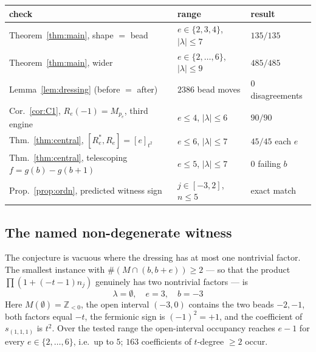 \documentclass[11pt]{article}
\theoremstyle{definition}
\newcommand{\Z}{\mathbb{Z}}
\newcommand{\Mult}[1]{M_{#1}}
\begin{document}
\begin{center}
\begin{tabular}{lll}
\hline
check & range & result\\
\hline
Theorem~\ref{thm:main}, shape $=$ bead & $e\in\{2,3,4\}$, $|\lambda|\le7$ & $135/135$\\
Theorem~\ref{thm:main}, wider & $e\in\{2,\dots,6\}$, $|\lambda|\le9$ & $485/485$\\
Lemma~\ref{lem:dressing} (before $=$ after) & $2386$ bead moves & $0$ disagreements\\
Cor.~\ref{cor:C1}, $R_e(-1)=\Mult{p_e}$, third engine & $e\le4$, $|\lambda|\le6$ & $90/90$\\
Thm.~\ref{thm:central}, $[R_e^{*},R_e]=[e]_{t^2}$ & $e\le6$, $|\lambda|\le7$ & $45/45$ each $e$\\
Thm.~\ref{thm:central}, telescoping $f=g(b)-g(b{+}1)$ & $e\le5$, $|\lambda|\le7$ & $0$ failing $b$\\
Prop.~\ref{prop:ordn}, predicted witness sign & $j\in[-3,2]$, $n\le5$ & exact match\\
\hline
\end{tabular}
\end{center}

\subsection*{The named non-degenerate witness}
The conjecture is vacuous where the dressing has at most one nontrivial factor.
The smallest instance with $\#(M\cap(b,b+e))\ge2$ --- so that the product
$\prod(1+(-t-1)n_j)$ genuinely has two nontrivial factors --- is
\[
  \boxed{\ \lambda=\emptyset,\quad e=3,\quad b=-3\ }
\]
Here $M(\emptyset)=\Z_{<0}$, the open interval $(-3,0)$ contains the two beads
$-2,-1$, both factors equal $-t$, the fermionic sign is $(-1)^2=+1$, and the
coefficient of $s_{(1,1,1)}$ is $t^{2}$.  Over the tested range the open-interval
occupancy reaches $e-1$ for every $e\in\{2,\dots,6\}$, i.e.\ up to $5$; $163$
coefficients of $t$-degree $\ge2$ occur.
\end{document}
